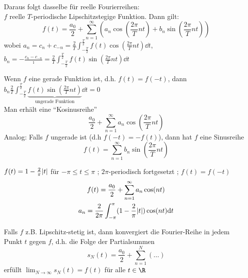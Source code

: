 Daraus folgt dasselbe für reelle Fourierreihen: \\
$f$ reelle $T$-periodische Lipschitzstegige Funktion. Dann gilt:
\[ f(t) = \frac{a_0}{2} + \sum_{n=1}^\infty \left( a_n \cos\left( \frac{2\pi}{T} nt \right) + b_n \sin\left( \frac{2\pi}{T} nt \right) \right) \]
wobei $a_n = c_n + c_{-n} = \frac{2}{T} \int_{-\frac{T}{2}}^{\frac{T}{2}} f(t) \cos\left( \frac{2\pi}{T} nt \right) \dd t$, $b_n = -\frac{c_n - c_{-n}}{\imath} = \frac{2}{T} \int_{-\frac{T}{2}}^{\frac{T}{2}} f(t) \sin\left( \frac{2\pi}{T} nt \right) \dd t$ \\
\begin{bem}
	Wenn $f$ eine gerade Funktion ist, d.h. $f(t) = f(-t)$, dann $b_n \frac{2}{T} \int_{-\frac{T}{2}}^{\frac{T}{2}} \underbrace{f(t) \sin\left( \frac{2\pi}{T} nt \right)}_{\text{ungerade Funktion}} \dd t = 0$ \\
	Man erhält eine \enquote{Kosinusreihe}
	\[ \frac{a_0}{2} + \sum_{n=1}^\infty a_n \cos\left( \frac{2\pi}{T} nt \right) \]
	Analog: Falls $f$ ungerade ist (d.h $f(-t) = -f(t)$), dann hat $f$ eine Sinusreihe
	\[ f(t) = \sum_{n=1}^\infty b_n \sin\left( \frac{2\pi}{T} nt \right) \]
\end{bem}
\begin{bsp*}
	$f(t) = 1 - \frac{2}{\pi} \abs{t}$ für $-\pi \leq t \leq \pi$ ; $2\pi$-periodisch fortgesetzt ; $f(t) = f(-t)$
	\begin{gather*}
		f(t) = \frac{a_0}{2} + \sum_{n=1}^\infty a_n \cos( nt ) \\
		a_n = \frac{2}{2\pi} \int_{-\pi}^{\pi} ( 1 - \frac{2}{\pi} \abs{t} ) \cos( nt ) \dd t
	\end{gather*}
\end{bsp*}

Falls $f$ z.B. Lipschitz-stetig ist, dann konvergiert die Fourier-Reihe in jedem Punkt $t$ gegen $f$, d.h. die Folge der Partialsummen
\[ s_N(t) = \frac{a_0}{2} + \sum_{n=1}^N ( \dots ) \]
erfüllt $\lim_{N \rightarrow \infty} s_N(t) = f(t)$ für alle $t \in \R$

